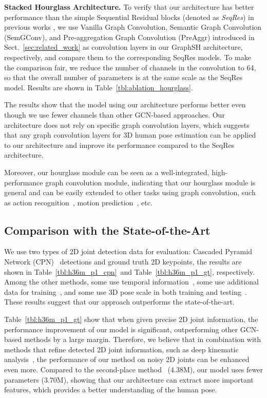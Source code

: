 \documentclass[final]{cvpr}
\begin{document}
\textbf{Stacked Hourglass Architecture.}
To verify that our architecture has better performance than the simple Sequential Residual blocks (denoted as \textit{SeqRes}) in previous works \cite{zhaoCVPR19semantic,Liu2020,wang2019gcn}, 
we use Vanilla Graph Convolution, Semantic Graph Convolution (SemGConv), and Pre-aggregation Graph Convolution (PreAggr) introduced in Sect.~\ref{sec:related_work} as convolution layers in our GraphSH architecture, respectively, and compare them to the corresponding SeqRes models.
To make the comparison fair, we reduce the number of channels in the convolution to 64, so that the overall number of parameters is at the same scale as the SeqRes model.
Results are shown in Table~\ref{tbl:ablation_hourglass}.

The results show that the model using our architecture performs better even though we use fewer channels than other GCN-based approaches. Our architecture does not rely on specific graph convolution layers, 
which suggests that any graph convolution layers for 3D human pose estimation can be applied to our architecture and improve its performance compared to the SeqRes architecture. 

Moreover, our hourglass module can be seen as a well-integrated, high-performance graph convolution module, indicating that our hourglass module is general and can be easily extended to other tasks using graph convolution, such as action recognition~\cite{stgcn2018aaai, Li_2019_CVPR}, motion prediction~\cite{Li2020DenselyCG}, etc.
   

\subsection{Comparison with the State-of-the-Art}
We use two types of 2D joint detection data for evaluation: Cascaded Pyramid Network (CPN)~\cite{Chen2018CPN} detections and ground truth 2D keypoints, the results are shown in Table~\ref{tbl:h36m_p1_cpn}~and Table~\ref{tbl:h36m_p1_gt}, respectively.
Among the other methods, some use temporal information~\cite{Lee2018PropagatingL3,pavllo:videopose3d:2019,cai2019exploiting,Xu_2020_CVPR}, some use additional data for training~\cite{sun2017,yang2018,Pavlakos2018}, and some use 3D pose scale in both training and testing~\cite{wang2019gcn}. 
These results suggest that our approach outperforms the state-of-the-art.

Table~\ref{tbl:h36m_p1_gt} show that when given precise 2D joint information, the performance improvement of our model is significant, outperforming other GCN-based methods by a large margin.
Therefore, we believe that in combination with methods that refine detected 2D joint information, such as deep kinematic analysis~\cite{Xu_2020_CVPR}, the performance of our method on noisy 2D joints can be enhanced even more.
Compared to the second-place method~\cite{Liu2020} (4.38M), our model uses fewer parameters (3.70M), showing that our architecture can extract more important features, which provides a better understanding of the human pose.
\end{document}
